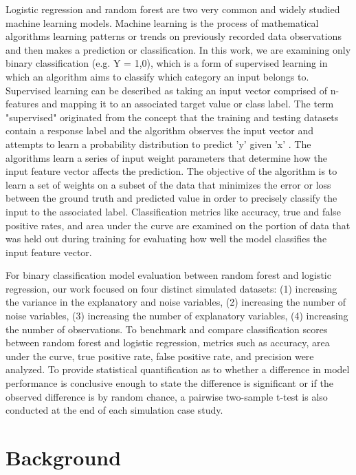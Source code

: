\documentclass{llncs}
\begin{document}
Logistic regression and random forest are two very common and widely studied machine learning models. Machine learning is the process of mathematical algorithms learning patterns or trends on previously recorded data observations and then makes a prediction or classification. In this work, we are examining only binary classification (e.g. Y = {1,0}), which is a form of supervised learning in which an algorithm aims to classify which category an input belongs to. Supervised learning can be described as taking an input vector comprised of n-features and mapping it to an associated target value or class label. The term "supervised" originated from the concept that the training and testing datasets contain a response label and the algorithm observes the input vector and attempts to learn a probability distribution to predict 'y' given 'x' \cite{goodfellow}. The algorithms learn a series of input weight parameters that determine how the input feature vector affects the prediction. The objective of the algorithm is to learn a set of weights on a subset of the data that minimizes the error or loss between the ground truth and predicted value in order to precisely classify the input to the associated label. Classification metrics like accuracy, true and false positive rates, and area under the curve are examined on the portion of data that was held out during training for evaluating how well the model classifies the input feature vector. 

For binary classification model evaluation between random forest and logistic regression, our work focused on four distinct simulated datasets: (1) increasing the variance in the explanatory and noise variables, (2) increasing the number of noise variables, (3) increasing the number of explanatory variables, (4) increasing the number of observations. To benchmark and compare classification scores between random forest and logistic regression, metrics such as accuracy, area under the curve, true positive rate, false positive rate, and precision were analyzed. To provide statistical quantification as to whether a difference in model performance is conclusive enough to state the difference is significant or if the observed difference is by random chance, a pairwise two-sample t-test is also conducted at the end of each simulation case study. 


\section{Background}
\end{document}
